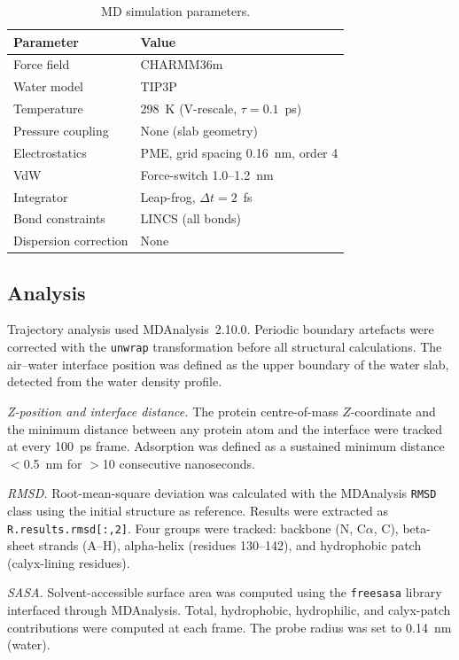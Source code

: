 \documentclass[journal=langd5,manuscript=article]{achemso}
\begin{document}
\begin{table}[h!]
  \centering
  \caption{MD simulation parameters.}
  \label{tab:mdparams}
  \begin{tabular}{ll}
    \toprule
    Parameter & Value \\
    \midrule
    Force field           & CHARMM36m \\
    Water model           & TIP3P \\
    Temperature           & 298~K (V-rescale, $\tau = 0.1$~ps) \\
    Pressure coupling     & None (slab geometry) \\
    Electrostatics        & PME, grid spacing 0.16~nm, order 4 \\
    VdW                   & Force-switch 1.0--1.2~nm \\
    Integrator            & Leap-frog, $\Delta t = 2$~fs \\
    Bond constraints      & LINCS (all bonds) \\
    Dispersion correction & None \\
    \bottomrule
  \end{tabular}
\end{table}

\subsection{Analysis}

Trajectory analysis used MDAnalysis~2.10.0.\cite{MichaudAgrawal2011,Gowers2016}
Periodic boundary artefacts were corrected with the \texttt{unwrap}
transformation before all structural calculations. The air--water interface
position was defined as the upper boundary of the water slab, detected from
the water density profile.

\textit{Z-position and interface distance.} The protein centre-of-mass
$Z$-coordinate and the minimum distance between any protein atom and the
interface were tracked at every 100~ps frame. Adsorption was defined as a
sustained minimum distance $<$0.5~nm for $>$10 consecutive nanoseconds.

\textit{RMSD.} Root-mean-square deviation was calculated with the MDAnalysis
\texttt{RMSD} class using the initial structure as reference.
Results were extracted as \texttt{R.results.rmsd[:,2]}. Four groups were tracked:
backbone (N, C$\alpha$, C), beta-sheet strands (A--H), alpha-helix
(residues 130--142), and hydrophobic patch (calyx-lining residues).

\textit{SASA.} Solvent-accessible surface area was computed using the
\texttt{freesasa} library\cite{Mitternacht2016} interfaced through MDAnalysis.
Total, hydrophobic, hydrophilic, and calyx-patch contributions were computed
at each frame. The probe radius was set to 0.14~nm (water).
\end{document}
